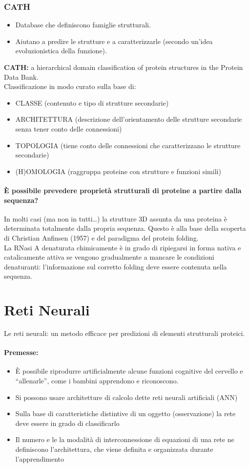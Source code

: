 \documentclass{article}
\begin{document}
\subsubsection{CATH}
\begin{itemize}
    \item Database che definiscono famiglie strutturali.
    \item Aiutano a predire le strutture e a caratterizzarle (secondo
    un'idea evoluzionistica della funzione).
\end{itemize}
\textbf{CATH:} a hierarchical domain classification of
protein structures in the Protein Data Bank.\\
Classificazione in modo curato sulla base di:
\begin{itemize}
    \item CLASSE (contenuto e tipo di strutture
    secondarie)
    \item ARCHITETTURA (descrizione
    dell'orientamento delle strutture
    secondarie senza tener conto delle
    connessioni)
    \item TOPOLOGIA (tiene conto delle
    connessioni che caratterizzano le strutture
    secondarie)
    \item (H)OMOLOGIA (raggruppa proteine con
    strutture e funzioni simili)
\end{itemize}
\paragraph{È possibile prevedere proprietà strutturali di
proteine a partire dalla sequenza?}
In molti casi (ma non in tutti…) la strutture 3D assunta da
una proteina è determinata totalmente dalla propria
sequenza. Questo è alla base della scoperta di Christian
Anfinsen (1957) e del paradigma del protein folding.\\
La RNasi A denaturata chimicamente è in grado di ripiegarsi in forma nativa e
catalicamente attiva se vengono gradualmente a mancare le condizioni
denaturanti: l'informazione sul corretto folding deve essere contenuta nella sequenza.
\section{Reti Neurali}
Le reti neurali: un metodo efficace per
predizioni di elementi strutturali proteici.
\paragraph{Premesse:}
\begin{itemize}
    \item È possibile riprodurre artificialmente alcune funzioni cognitive del
    cervello e “allenarle”, come i bambini apprendono e riconoscono.
    \item Si possono usare architetture di calcolo dette reti neurali artificiali
    (ANN)
    \item Sulla base di caratteristiche distintive di un oggetto (osservazione) la
    rete deve essere in grado di classificarlo
    \item Il numero e le la modalità di interconnessione di equazioni di una
    rete ne definiscono l'architettura, che viene definita e organizzata
    durante l'apprendimento
\end{itemize}
\end{document}
